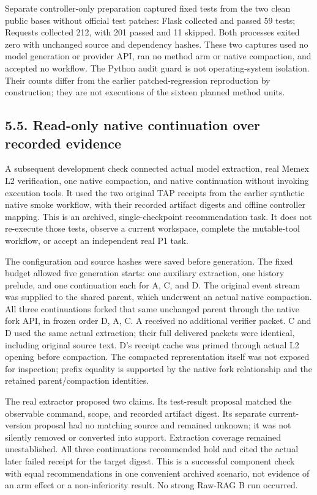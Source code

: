 \documentclass[
  11pt,
  a4paper,
]{article}
\begin{document}
Separate controller-only preparation captured fixed tests from the two
clean public bases without official test patches: Flask collected and
passed 59 tests; Requests collected 212, with 201 passed and 11 skipped.
Both processes exited zero with unchanged source and dependency hashes.
These two captures used no model generation or provider API, ran no
method arm or native compaction, and accepted no workflow. The Python
audit guard is not operating-system isolation. Their counts differ from
the earlier patched-regression reproduction by construction; they are
not executions of the sixteen planned method units.

\subsection{5.5. Read-only native continuation over recorded
evidence}\label{read-only-native-continuation-over-recorded-evidence}

A subsequent development check connected actual model extraction, real
Memex L2 verification, one native compaction, and native continuation
without invoking execution tools. It used the two original TAP receipts
from the earlier synthetic native smoke workflow, with their recorded
artifact digests and offline controller mapping. This is an archived,
single-checkpoint recommendation task. It does not re-execute those
tests, observe a current workspace, complete the mutable-tool workflow,
or accept an independent real P1 task.

The configuration and source hashes were saved before generation. The
fixed budget allowed five generation starts: one auxiliary extraction,
one history prelude, and one continuation each for A, C, and D. The
original event stream was supplied to the shared parent, which underwent
an actual native compaction. All three continuations forked that same
unchanged parent through the native fork API, in frozen order D, A, C. A
received no additional verifier packet. C and D used the same actual
extraction; their full delivered packets were identical, including
original source text. D's receipt cache was primed through actual L2
opening before compaction. The compacted representation itself was not
exposed for inspection; prefix equality is supported by the native fork
relationship and the retained parent/compaction identities.

The real extractor proposed two claims. Its test-result proposal matched
the observable command, scope, and recorded artifact digest. Its
separate current-version proposal had no matching source and remained
unknown; it was not silently removed or converted into support.
Extraction coverage remained unestablished. All three continuations
recommended hold and cited the actual later failed receipt for the
target digest. This is a successful component check with equal
recommendations in one convenient archived scenario, not evidence of an
arm effect or a non-inferiority result. No strong Raw-RAG B run
occurred.
\end{document}
